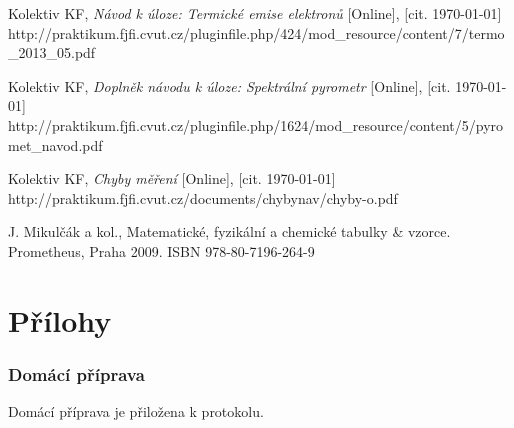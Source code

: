 \documentclass[english]{article}
\begin{document}
\begin{thebibliography}{9}
 Kolektiv KF, \emph{Návod k úloze: Termické emise elektronů} [Online], [cit. \today] \newline http://praktikum.fjfi.cvut.cz/pluginfile.php/424/mod\_resource/content/7/termo\_2013\_05.pdf

 Kolektiv KF, \emph{Doplněk návodu k úloze: Spektrální pyrometr} [Online], [cit. \today] \newline http://praktikum.fjfi.cvut.cz/pluginfile.php/1624/mod\_resource/content/5/pyromet\_navod.pdf



 Kolektiv KF, \emph{Chyby měření} [Online], [cit. \today] \newline http://praktikum.fjfi.cvut.cz/documents/chybynav/chyby-o.pdf


 J. Mikulčák a kol., Matematické, fyzikální a chemické tabulky \& vzorce. Prometheus,
Praha 2009.\newline
ISBN 978-80-7196-264-9


\end{thebibliography}
\endgroup
\setcounter{equation}{0}
\part{Přílohy}

\section{Domácí příprava}
	Domácí příprava je přiložena k protokolu.
\end{document}
